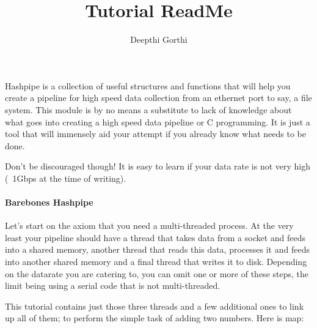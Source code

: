 \documentclass[12pt]{article}
\begin{document}
\title{Tutorial ReadMe} \author{Deepthi Gorthi}
\maketitle

Hashpipe is a collection of useful structures and functions that will help 
you create a pipeline for high speed data collection from an ethernet 
port to say, a file system. This module is by no means a substitute to lack of 
knowledge about what goes into creating a high speed data pipeline or 
C programming. It is just a tool that will immensely aid your attempt if you 
already know what needs to be done.

Don't be discouraged though! It is easy to learn if your data rate is not 
very high (~1Gbps at the time of writing).

\paragraph{Barebones Hashpipe} Let's start on the axiom that you need a 
multi-threaded process. At the very least your pipeline should have a thread that 
takes data from a socket and feeds into a shared memory, another thread that 
reads this data, processes it and feeds into another shared memory and a final 
thread that writes it to disk. Depending on the datarate you are catering to, 
you can omit one or more of these steps, the limit being using a serial code 
that is not multi-threaded.

This tutorial contains just those three threads and a few additional ones to 
link up all of them; to perform the simple task of adding two numbers. 
Here is map:
\end{document}

